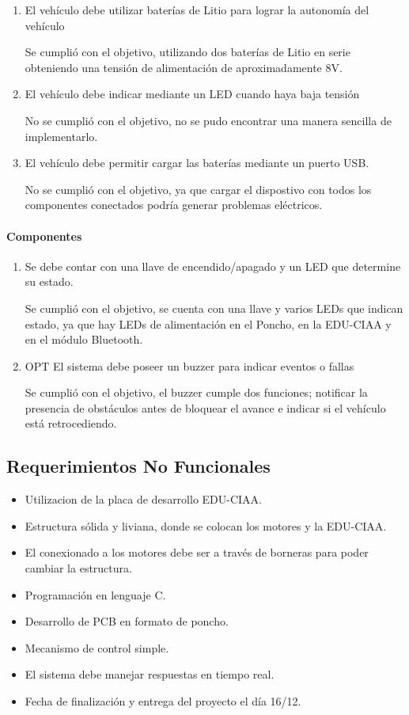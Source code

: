 \begin{enumerate}
\def\labelenumi{\arabic{enumi}.}
\item
  El vehículo debe utilizar baterías de Litio para lograr la autonomía
  del vehículo

  Se cumplió con el objetivo, utilizando dos baterías de Litio en serie
  obteniendo una tensión de alimentación de aproximadamente 8V.
\item
  El vehículo debe indicar mediante un LED cuando haya baja tensión

  No se cumplió con el objetivo, no se pudo encontrar una manera
  sencilla de implementarlo.
\item
  El vehículo debe permitir cargar las baterías mediante un puerto USB.

  No se cumplió con el objetivo, ya que cargar el dispostivo con todos
  los componentes conectados podría generar problemas eléctricos.
\end{enumerate}

\paragraph{Componentes}

\begin{enumerate}
\def\labelenumi{\arabic{enumi}.}
\item
  Se debe contar con una llave de encendido/apagado y un LED que
  determine su estado.

  Se cumplió con el objetivo, se cuenta con una llave y varios LEDs que
  indican estado, ya que hay LEDs de alimentación en el Poncho, en la
  EDU-CIAA y en el módulo Bluetooth.
\item
  OPT El sistema debe poseer un buzzer para indicar eventos o fallas

  Se cumplió con el objetivo, el buzzer cumple dos funciones; notificar
  la presencia de obstáculos antes de bloquear el avance e indicar si el
  vehículo está retrocediendo.
\end{enumerate}

\subsection{Requerimientos No Funcionales}

\begin{itemize}
\tightlist
\item
  Utilizacion de la placa de desarrollo EDU-CIAA.
\item
  Estructura sólida y liviana, donde se colocan los motores y la
  EDU-CIAA.
\item
  El conexionado a los motores debe ser a través de borneras para poder
  cambiar la estructura.
\item
  Programación en lenguaje C.
\item
  Desarrollo de PCB en formato de poncho.
\item
  Mecanismo de control simple.
\item
  El sistema debe manejar respuestas en tiempo real.
\item
  Fecha de finalización y entrega del proyecto el día 16/12.
\end{itemize}

